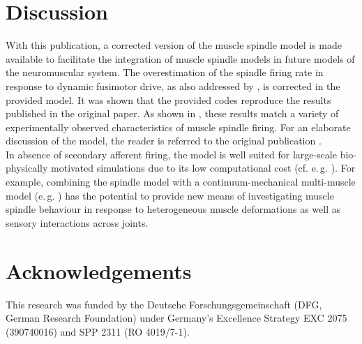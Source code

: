 \documentclass[fleqn,10pt]{physiome}
\begin{document}
\section{Discussion}
With this publication, a corrected version of the \citet{maltenfort2003} muscle spindle model is made available to facilitate the integration of muscle spindle models in future models of the neuromuscular system. 
The overestimation of the spindle firing rate in response to dynamic fusimotor drive, as also addressed by \citet{grandjean2014}, is corrected in the provided model. 
It was shown that the provided codes reproduce the results published in the original paper. 
As shown in \citet{maltenfort2003}, these results match a variety of experimentally observed characteristics of muscle spindle firing. 
For an elaborate discussion of the model, the reader is referred to the original publication \citep{maltenfort2003}. \\
In absence of secondary afferent firing, the model is well suited for large-scale bio-physically motivated simulations due to its low computational cost (cf. e.\,g. \citealp{rohrle2019}). 
For example, combining the spindle model with a continuum-mechanical multi-muscle model (e.\,g. \citealp{roehrle2017}) has the potential to provide new means of investigating muscle spindle behaviour in response to heterogeneous muscle deformations as well as sensory interactions across joints.


\FloatBarrier

\section*{Acknowledgements}
This research was funded by the Deutsche Forschungsgemeinschaft (DFG, German Research Foundation) under Germany’s Excellence Strategy EXC 2075 (390740016) and SPP 2311 (RO 4019/7-1).


\end{document}
